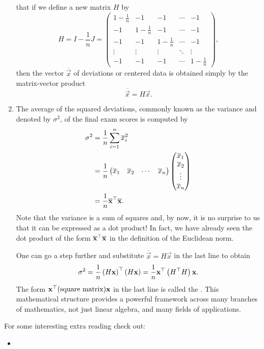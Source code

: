\documentclass{ximera}
\begin{document}
\begin{example}
\begin{enumerate}
    that if we define a new matrix $H$ by
    \[
      H = I - \frac{1}{n} J =
      \begin{pmatrix}
        1-\frac{1}{n} & -1 & -1 & \cdots & -1 \\
        -1 & 1-\frac{1}{n} & -1 & \cdots & -1 \\
        -1 & -1 & 1-\frac{1}{n} & \cdots & -1 \\
        \vdots & \vdots & \vdots & \ddots & \vdots \\
        -1 & -1 & -1 & \cdots & 1-\frac{1}{n}
      \end{pmatrix},
    \]
    then the vector $\overline{\vec{x}}$ of deviations or centered
    data is obtained simply by the matrix-vector product
    \[
      \overline{\vec{x}} = H\vec{x}.
    \]
  \item The average of the squared deviations, commonly known as the
    variance and denoted by $\sigma^2$, of the final exam scores is
    computed by
    \begin{align*}
      \sigma^2
      & = \frac{1}{n} \sum_{i=1}^n \overline{x}_i^2 \\
      & = \frac{1}{n}
        \begin{pmatrix}
          \overline{x}_1 & \overline{x}_2 & \cdots & \overline{x}_n
        \end{pmatrix}
        \begin{pmatrix}
          \overline{x}_1 \\ \overline{x}_2 \\ \vdots \\ \overline{x}_n
        \end{pmatrix} \\
      & = \frac{1}{n} \overline{\mathbf{x}}^\top \overline{\mathbf{x}}.
    \end{align*}
    Note that the variance is a sum of squares and, by now, it is no
    surprise to us that it can be expressed as a dot product! In fact,
    we have already seen the dot product of the form
    $\overline{\mathbf{x}}^\top \overline{\mathbf{x}}$ in the
    definition of the Euclidean norm.

    One can go a step further and substitute
    $\overline{\vec{x}} = H \vec{x}$ in the last line to obtain
    \[
      \sigma^2
      = \frac{1}{n} \left( H \mathbf{x} \right)^\top \left( H
        \mathbf{x} \right)
      = \frac{1}{n} \mathbf{x}^\top \left( H^\top H \right) \mathbf{x}.
    \]
    The form $\mathbf{x}^\top \text{(square matrix)} \mathbf{x}$ in
    the last line is called the \textit{}. This
    mathematical structure provides a powerful framework across many
    branches of mathematics, not just linear algebra, and many fields
    of applications.
  \end{enumerate}
\end{example}




For some interesting extra reading check out:
\begin{itemize}
\item {}
\end{itemize}
\end{document}
